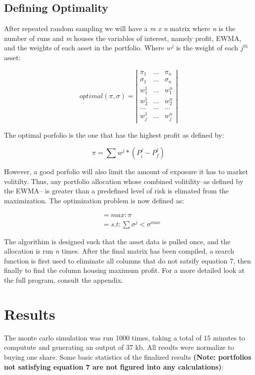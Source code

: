 \documentclass[12pt]{article}
\begin{document}
\subsection{Defining Optimality}
After repeated random sampling we will have a \emph{m x n} matrix where \emph{n} is the number of runs and \emph{m} houses the variables of interest, namely profit, EWMA, and the weights of each asset in the portfolio. Where $w^{j}$ is the weight of each $j^{th}$ asset:

\[optimal(\pi, \sigma) = \left | \begin{array}{ccc}
\pi_{1} & ... & \pi_{n} \\
\sigma_{1} & ... & \sigma_{n} \\
w_{1}^{1}  & ... & w_{1}^{n} \\
w_{2}^{1}  & ... & w_{2}^{n} \\
... & ... & ... \\
w_{j}^{1}  & ... & w_{j}^{n} \end{array} \right |\]

The optimal porfolio is the one that has the highest profit as defined by:

\begin{equation}
	\pi = \sum{w^{j} *(P_{i}^{j} - P_{f}^{j})}
\end{equation}

However, a good porfolio will also limit the amount of exposure it has to market volitilty. Thus, any portfolio allocation whose combined volitility--as defined by the EWMA-- is greater than a predefined level of risk is elimated from the maximization. The optimization problem is now defined as:

\begin{equation}
	\begin{split} 
		&= max: \pi \\ 
		&= s.t: \sum{\sigma^{j}} < \sigma^{max}
	\end{split}
\end{equation}

The algorithim is designed such that the asset data is pulled once, and the allocation is run \emph{n} times. After the final matrix has been compiled, a search function is first used to eliminate all columns that do not satsify equation 7, then finally to find the column housing maximum profit. For a more detailed look at the full program, consult the appendix. 

\section{Results}
The monte carlo simulation was run 1000 times, taking a total of 15 minutes to computute and generating an output of 37 kb. All results were normalize to buying one share. Some basic statistics of the finalized results {\bf (Note: portfolios not satisfying equation 7 are not figured into any calculations)}:
\end{document}
